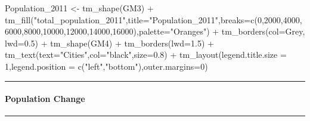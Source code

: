 \documentclass[
]{article}
\newenvironment{Shaded}{\begin{snugshade}}{\end{snugshade}}
\newcommand{\AttributeTok}[1]{\textcolor[rgb]{0.77,0.63,0.00}{#1}}
\newcommand{\DecValTok}[1]{\textcolor[rgb]{0.00,0.00,0.81}{#1}}
\newcommand{\FloatTok}[1]{\textcolor[rgb]{0.00,0.00,0.81}{#1}}
\newcommand{\FunctionTok}[1]{\textcolor[rgb]{0.00,0.00,0.00}{#1}}
\newcommand{\NormalTok}[1]{#1}
\newcommand{\OtherTok}[1]{\textcolor[rgb]{0.56,0.35,0.01}{#1}}
\newcommand{\SpecialCharTok}[1]{\textcolor[rgb]{0.00,0.00,0.00}{#1}}
\newcommand{\StringTok}[1]{\textcolor[rgb]{0.31,0.60,0.02}{#1}}
\begin{document}
\begin{Shaded}
\begin{Highlighting}[]
\NormalTok{Population\_2011 }\OtherTok{\textless{}{-}} \FunctionTok{tm\_shape}\NormalTok{(GM3) }\SpecialCharTok{+}
  \FunctionTok{tm\_fill}\NormalTok{(}\StringTok{"total\_population\_2011"}\NormalTok{,}\AttributeTok{title=}\StringTok{"Population\_2011"}\NormalTok{,}\AttributeTok{breaks=}\FunctionTok{c}\NormalTok{(}\DecValTok{0}\NormalTok{,}\DecValTok{2000}\NormalTok{,}\DecValTok{4000}\NormalTok{,}\DecValTok{6000}\NormalTok{,}\DecValTok{8000}\NormalTok{,}\DecValTok{10000}\NormalTok{,}\DecValTok{12000}\NormalTok{,}\DecValTok{14000}\NormalTok{,}\DecValTok{16000}\NormalTok{),}\AttributeTok{palette=}\StringTok{"Oranges"}\NormalTok{) }\SpecialCharTok{+}
 \FunctionTok{tm\_borders}\NormalTok{(}\AttributeTok{col=}\StringTok{\textquotesingle{}Grey\textquotesingle{}}\NormalTok{, }\AttributeTok{lwd=}\FloatTok{0.5}\NormalTok{) }\SpecialCharTok{+}
\FunctionTok{tm\_shape}\NormalTok{(GM4) }\SpecialCharTok{+}
  \FunctionTok{tm\_borders}\NormalTok{(}\AttributeTok{lwd=}\FloatTok{1.5}\NormalTok{) }\SpecialCharTok{+}
  \FunctionTok{tm\_text}\NormalTok{(}\AttributeTok{text=}\StringTok{"Cities"}\NormalTok{,}\AttributeTok{col=}\StringTok{"black"}\NormalTok{,}\AttributeTok{size=}\FloatTok{0.8}\NormalTok{) }\SpecialCharTok{+}
\FunctionTok{tm\_layout}\NormalTok{(}\AttributeTok{legend.title.size =} \DecValTok{1}\NormalTok{,}\AttributeTok{legend.position =} \FunctionTok{c}\NormalTok{(}\StringTok{"left"}\NormalTok{,}\StringTok{"bottom"}\NormalTok{),}\AttributeTok{outer.margins=}\DecValTok{0}\NormalTok{)}
\end{Highlighting}
\end{Shaded}

\begin{center}\rule{0.5\linewidth}{0.5pt}\end{center}

\hypertarget{population-change}{%
\paragraph{Population Change}\label{population-change}}

\begin{center}\rule{0.5\linewidth}{0.5pt}\end{center}
\end{document}
